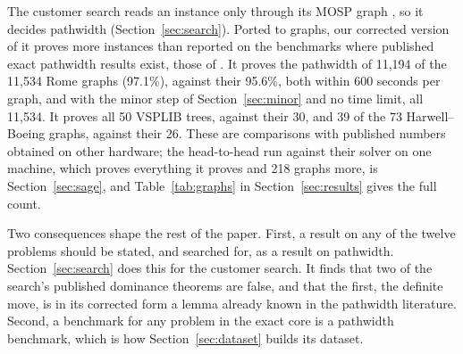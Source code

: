 The customer search reads an instance only through its MOSP graph
\citep[p.~4]{ChuStuckey2009}, so it decides pathwidth
(Section~\ref{sec:search}). Ported to graphs, our corrected version of it proves more instances than reported on the benchmarks where published exact pathwidth results exist, those
of \citet{CoudertMazauricNisse2016}. It proves the pathwidth of 11,194 of the
11,534 Rome graphs (97.1\%), against their 95.6\%, both within 600 seconds per
graph, and with the minor step of Section~\ref{sec:minor} and no time limit,
all 11,534. It proves all 50 VSPLIB trees, against their 30, and 39 of the 73
Harwell--Boeing graphs, against their 26. These are comparisons with published
numbers obtained on other hardware; the head-to-head run against their solver
on one machine, which proves everything it proves and 218 graphs more, is
Section~\ref{sec:sage}, and Table~\ref{tab:graphs} in Section~\ref{sec:results} gives the full count.

Two consequences shape the rest of the paper. First, a result on any of the
twelve problems should be stated, and searched for, as a result on pathwidth.
Section~\ref{sec:search} does this for the customer search. It finds that two of the search's published dominance theorems are false, and that the first, the definite move, is in its corrected form a lemma already known in the pathwidth literature.
Second, a benchmark for any problem in the exact core is a pathwidth benchmark,
which is how Section~\ref{sec:dataset} builds its dataset.
